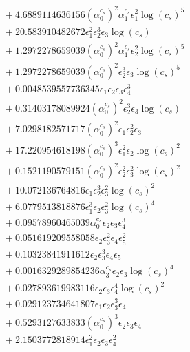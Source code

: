 \documentclass[10pt]{article}
\begin{document}
\begin{align*}
&{}  + 4.6889114636156 \left(\alpha_{0}^{c_s}\right)^{2} \alpha_{1}^{c_s} \epsilon_{1}^{2} \log{\left(c_{s} \right)}^{5} \\
&{}  + 20.583910482672 \epsilon_{1}^{2} \epsilon_{2}^{3} \epsilon_{3} \log{\left(c_{s} \right)} \\
&{}  + 1.2972278659039 \left(\alpha_{0}^{c_s}\right)^{2} \alpha_{1}^{c_s} \epsilon_{2}^{2} \log{\left(c_{s} \right)}^{5} \\
&{}  + 1.2972278659039 \left(\alpha_{0}^{c_s}\right)^{2} \epsilon_{2}^{3} \epsilon_{3} \log{\left(c_{s} \right)}^{5} \\
&{}  + 0.0048539557736345 \epsilon_{1} \epsilon_{2} \epsilon_{3} \epsilon_{4}^{3} \\
&{}  + 0.31403178089924 \left(\alpha_{0}^{c_s}\right)^{2} \epsilon_{2}^{3} \epsilon_{3} \log{\left(c_{s} \right)} \\
&{}  + 7.0298182571717 \left(\alpha_{0}^{c_s}\right)^{2} \epsilon_{1} \epsilon_{2}^{2} \epsilon_{3} \\
&{}  + 17.220954618198 \left(\alpha_{0}^{c_s}\right)^{3} \epsilon_{1}^{2} \epsilon_{2} \log{\left(c_{s} \right)}^{2} \\
&{}  + 0.1521190579151 \left(\alpha_{0}^{c_s}\right)^{2} \epsilon_{2}^{2} \epsilon_{3}^{2} \log{\left(c_{s} \right)}^{2} \\
&{}  + 10.072136764816 \epsilon_{1} \epsilon_{2}^{3} \epsilon_{3}^{2} \log{\left(c_{s} \right)}^{2} \\
&{}  + 6.0779513818876 \epsilon_{1}^{3} \epsilon_{2} \epsilon_{3}^{2} \log{\left(c_{s} \right)}^{4} \\
&{}  + 0.09578960465039 \alpha_{0}^{c_s} \epsilon_{2} \epsilon_{3} \epsilon_{4}^{3} \\
&{}  + 0.051619209558058 \epsilon_{2} \epsilon_{3}^{2} \epsilon_{4} \epsilon_{5}^{2} \\
&{}  + 0.10323841911612 \epsilon_{2} \epsilon_{3}^{3} \epsilon_{4} \epsilon_{5} \\
&{}  + 0.0016329289854236 \alpha_{3}^{c_s} \epsilon_{2} \epsilon_{3} \log{\left(c_{s} \right)}^{4} \\
&{}  + 0.027893619983116 \epsilon_{2} \epsilon_{3} \epsilon_{4}^{4} \log{\left(c_{s} \right)}^{2} \\
&{}  + 0.029123734641807 \epsilon_{1} \epsilon_{2} \epsilon_{3}^{3} \epsilon_{4} \\
&{}  + 0.5293127633833 \left(\alpha_{0}^{c_s}\right)^{3} \epsilon_{2} \epsilon_{3} \epsilon_{4} \\
&{}  + 2.1503772818914 \epsilon_{1}^{2} \epsilon_{2} \epsilon_{3} \epsilon_{4}^{2} \\

\end{align*}
\end{document}
